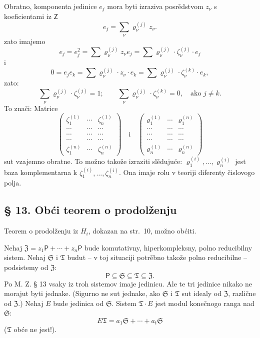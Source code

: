 \documentclass[11pt]{article}
\begin{document}
Obratno, komponenta jedinice \(e_j\) mora byti izraziva posrědstvom \(z_\nu\) s koeficientami iz \(\mathsf Z\)
\[
e_j=\sum_\nu \varrho_\nu^{(j)}z_\nu .
\]
zato imajemo
\[
e_j=e_j^2=\sum \varrho_\nu^{(j)}z_\nu e_j
=\sum \varrho_\nu^{(j)}\cdot\zeta_\nu^{(j)}\cdot e_j
\]
i
\[
0=e_je_k=\sum \varrho_\nu^{(j)}\cdot z_\nu\cdot e_k
=\sum \varrho_\nu^{(j)}\cdot\zeta_\nu^{(k)}\cdot e_k,
\]
zato:
\[
\sum_\nu \varrho_\nu^{(j)}\cdot\zeta_\nu^{(j)}=1;
\qquad
\sum_\nu \varrho_\nu^{(j)}\cdot\zeta_\nu^{(k)}=0,\quad
\text{ako } j\ne k.
\]
To znači: Matrice
\[
\begin{pmatrix}
\zeta_1^{(1)} & \cdots & \zeta_n^{(1)}\\
\cdots & \cdots & \cdots\\
\cdots & \cdots & \cdots\\
\cdots & \cdots & \cdots\\
\zeta_1^{(n)} & \cdots & \zeta_n^{(n)}
\end{pmatrix}
\quad\text{i}\quad
\begin{pmatrix}
\varrho_1^{(1)} & \cdots & \varrho_1^{(n)}\\
\cdots & \cdots & \cdots\\
\cdots & \cdots & \cdots\\
\cdots & \cdots & \cdots\\
\varrho_n^{(1)} & \cdots & \varrho_n^{(n)}
\end{pmatrix}
\]
sut vzajemno obratne. To možno takože izraziti slědujuće: \(\varrho_1^{(i)},\ldots,\varrho_n^{(i)}\) jest baza komplementarna k \(\zeta_1^{(i)},\ldots,\zeta_n^{(i)}\). Ona imaje rolu v teoriji diferenty čislovogo polja.

\subsection*{§ 13. Obći teorem o prodolženju}\label{der-allgemeine-fortsetzungssatz}

Teorem o prodolženju iz \(H_i\), dokazan na str.~10, možno obćiti.

Nehaj \(\mathfrak Z=z_1\mathsf P+\cdots+z_n\mathsf P\) bude komutativny, hiperkompleksny, polno reducibilny sistem. Nehaj \(\mathfrak S\) i \(\mathfrak T\) budut -- v toj situaciji potrěbno takože polno reducibilne -- podsistemy od \(\mathfrak Z\):
\[
\mathsf P\subseteq\mathfrak S\subseteq\mathfrak T\subseteq\mathfrak Z .
\]
Po M. Z. § 13 vsaky iz troh sistemov imaje jedinicu. Ale te tri jedinice nikako ne morajut byti jednake. (Sigurno ne sut jednake, ako \(\mathfrak S\) i \(\mathfrak T\) sut idealy od \(\mathfrak Z\), različne od \(\mathfrak Z\).) Nehaj \(E\) bude jedinica od \(\mathfrak S\). Sistem \(\mathfrak T\cdot E\) jest modul konečnogo ranga nad \(\mathfrak S\):
\[
E\mathfrak T=a_1\mathfrak S+\cdots+a_t\mathfrak S
\]
(\(\mathfrak T\) obće ne jest!).
\end{document}
